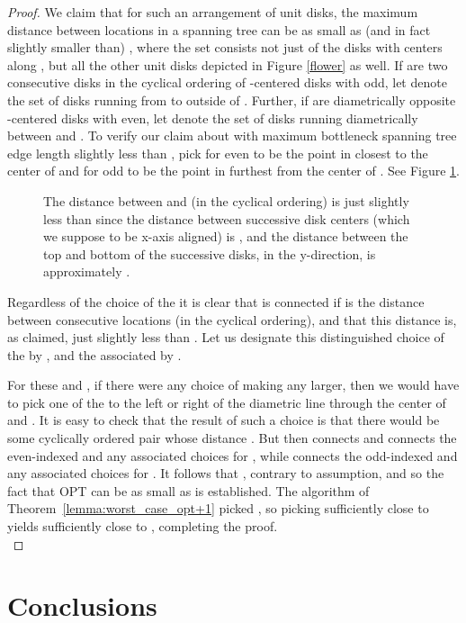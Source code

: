 \begin{proof}
We claim that for such an arrangement of unit disks, the maximum distance between locations  in a spanning tree can be as small as (and in fact slightly smaller than) , where the set  consists not just of the disks  with centers along , but all the other unit disks depicted in Figure \ref{flower} as well.  If  are two consecutive disks in the cyclical ordering of -centered disks with  odd, let  denote the set of disks running from  to  outside of .  Further, if  are diametrically opposite -centered disks with  even, let  denote the set of disks running diametrically between  and .  To verify our claim about  with maximum bottleneck spanning tree edge length slightly less than , pick  for even  to be the point in  closest to the center of  and  for odd  to be the point in  furthest from the center of .  See Figure \ref{ells}.
\begin{figure}[h]
\centerline{}
\caption{The distance between  and  (in the cyclical ordering) is just slightly less than  since the distance between successive disk centers (which we suppose to be x-axis aligned) is , and the distance between the top and bottom of the successive disks, in the y-direction, is approximately .}
\label{ells}
\end{figure}
Regardless of the choice of the  it is clear that  is connected if  is the distance between consecutive locations  (in the cyclical ordering), and that this distance is, as claimed, just slightly less than .  Let us designate this distinguished choice of the  by , and the associated  by .

For these  and , if there were any choice of  making  any larger, then we would have to pick one of the  to the left or right of the diametric line through the center of  and .
It is easy to check that the result of such a choice is that there would be some cyclically ordered pair  whose distance .
But then  connects  and  connects the even-indexed  and any associated choices for , while  connects the odd-indexed  and any associated choices for .  It follows that , contrary to assumption, and so the fact that OPT can be as small as  is established.
The algorithm of Theorem~\ref{lemma:worst_case_opt+1} picked , so picking  sufficiently close to  yields  sufficiently close to
, completing the proof. \\\end{proof}


 

\makeatletter{}\section{Conclusions}
\label{sec:other}

